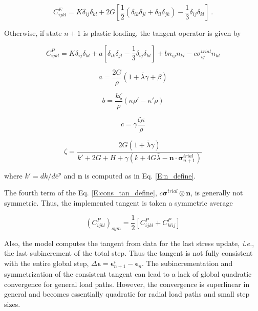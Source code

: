 \documentclass[11pt]{report}
\numberwithin{equation}{section}
\newcommand{\bmf } {\boldsymbol }
\begin{document}
\begin{equation}
C_{ijkl}^E = K{\delta _{ij}}{\delta _{kl}} + 2G\left[ {\frac{1}{2}\left( {{\delta _{ik}}{\delta _{jl}} + {\delta _{il}}{\delta _{jk}}} \right) - \frac{1}{3}{\delta _{ij}}{\delta _{kl}}} \right]~.
\end{equation}

\noindent Otherwise, if state $n+1$ is plastic loading, the tangent operator is
given by

\begin{equation}\label{E:cons_tan_define}
C_{ijkl}^P = K{\delta _{ij}}{\delta _{kl}} + a\left[ {{\delta _{ik}}{\delta _{jl}} -
\frac{1}{3}{\delta _{ij}}{\delta _{kl}}} \right] + b{n_{ij}}{n_{kl}} - 
c\sigma _{ij}^{trial}n{_{kl}}
\end{equation}

\begin{equation}
a = \frac{{2G}}{\rho }\left( {1 + \bar \lambda \gamma  + \beta } \right)
\end{equation}

\begin{equation}
b = \frac{{k\zeta }}{\rho }\left( {\kappa \rho ' - \kappa '\rho } \right)
\end{equation}

\begin{equation}
c = \gamma \frac{{\zeta \kappa }}{\rho }
\end{equation}

\begin{equation}
\zeta  = \frac{{2G\left( {1 + \bar \lambda \gamma } \right)}}{{k' + 2G +  H + 
\gamma \left( {k + 4G\bar \lambda  - {\bmf{n}} 
\cdot {\bmf{\sigma }}_{n + 1}^{trial}} \right)}}
\end{equation}

\noindent where  $k' = dk / d\bar e^p$ and $\bmf n$ is computed as in Eq. \eqref{E:n_define}.

The fourth term of the Eq. \eqref{E:cons_tan_define}, $c \bmf \sigma^{trial} 
\otimes \bmf n$, is
generally not symmetric. Thus, the implemented tangent is taken a symmetric
average

\begin{equation}
{\left( {C_{ijkl}^P} \right)_{sym}} = \frac{1}{2}\left[ {C_{ijkl}^P + C_{klij}^P} \right]
\end{equation}

Also, the model computes the tangent from data for the 
last stress update, \textit{i.e.}, the last subincrement of the total step. 
Thus the tangent is not fully consistent with the entire global step,
$\Delta \bmf \epsilon = 
\bmf\epsilon^i_{n+1} -  \bmf\epsilon_n$. The subincrementation and
symmetrization of the consistent tangent can lead to a lack of global quadratic 
convergence for general load paths. However, the convergence is superlinear in general 
and becomes essentially quadratic for radial load paths and small step sizes. 
\end{document}
